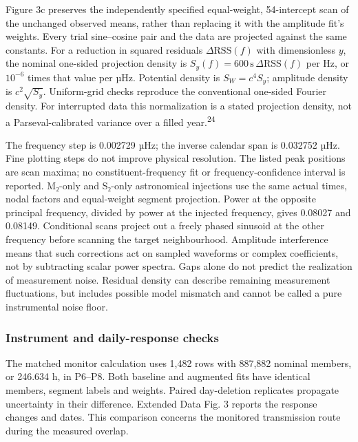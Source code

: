 \documentclass[
  12pt,
  a4paper,
]{article}
\begin{document}
Figure 3c preserves the independently specified equal-weight,
54-intercept scan of the unchanged observed means, rather than replacing
it with the amplitude fit's weights. Every trial sine--cosine pair and
the data are projected against the same constants. For a reduction in
squared residuals \(\Delta\mathrm{RSS}(f)\) with dimensionless \(y\),
the nominal one-sided projection density is
\(S_y(f)=600\,\mathrm{s}\,\Delta\mathrm{RSS}(f)\) per Hz, or \(10^{-6}\)
times that value per µHz. Potential density is \(S_W=c^4S_y\); amplitude
density is \(c^2\sqrt{S_y}\). Uniform-grid checks reproduce the
conventional one-sided Fourier density. For interrupted data this
normalization is a stated projection density, not a Parseval-calibrated
variance over a filled year.\textsuperscript{24}

The frequency step is 0.002729 µHz; the inverse calendar span is
0.032752 µHz. Fine plotting steps do not improve physical resolution.
The listed peak positions are scan maxima; no constituent-frequency fit
or frequency-confidence interval is reported. M₂-only and S₂-only
astronomical injections use the same actual times, nodal factors and
equal-weight segment projection. Power at the opposite principal
frequency, divided by power at the injected frequency, gives 0.08027 and
0.08149. Conditional scans project out a freely phased sinusoid at the
other frequency before scanning the target neighbourhood. Amplitude
interference means that such corrections act on sampled waveforms or
complex coefficients, not by subtracting scalar power spectra. Gaps
alone do not predict the realization of measurement noise. Residual
density can describe remaining measurement fluctuations, but includes
possible model mismatch and cannot be called a pure instrumental noise
floor.

\hypertarget{instrument-and-daily-response-checks}{%
\subsubsection{Instrument and daily-response
checks}\label{instrument-and-daily-response-checks}}

The matched monitor calculation uses 1,482 rows with 887,882 nominal
members, or 246.634 h, in P6--P8. Both baseline and augmented fits have
identical members, segment labels and weights. Paired day-deletion
replicates propagate uncertainty in their difference. Extended Data Fig.
3 reports the response changes and dates. This comparison concerns the
monitored transmission route during the measured overlap.
\end{document}
